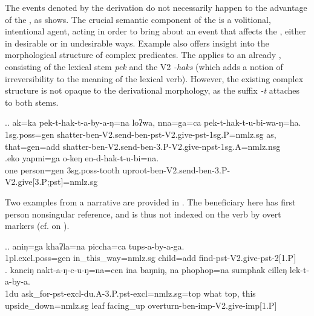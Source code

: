 The events denoted by the  derivation do not necessarily happen to the advantage of the , as \Next shows. The crucial semantic component of the  is a volitional, intentional agent, acting in order to bring about an event that affects the , either in desirable or in undesirable ways. Example \Next also offers insight into the morphological structure of complex predicates. The  applies to an already , consisting of the lexical stem \emph{pek}  and the V2 \emph{-haks}  (which adds a notion of irreversibility to the meaning of the lexical verb). However, the existing complex structure is not opaque to the derivational morphology, as the  suffix \emph{-t} attaches to both stems.

\ex.\ag. ak=ka pek-t-hak-t-a-by-a-ŋ=na loʔwa, nna=ga=ca  pek-t-hak-t-u-bi-wa-ŋ=ha.\\
{\sc 1sg.poss=gen} shatter-{\sc ben-V2.send-ben-pst-V2.give-pst-1sg.P=nmlz.sg} as,   that{\sc =gen=add} shatter-{\sc ben-V2.send-ben-3.P-V2.give-npst-1sg.A=nmlz.nsg}\\
 
\bg.eko yapmi=ga o-keŋ en-d-hak-t-u-bi=na.\\
one person{\sc =gen} {\sc 3sg.poss-}tooth	uproot{\sc -ben-V2.send-ben-3.P-V2.give[3.P;pst]=nmlz.sg}\\
 
\largerpage
Two examples from a narrative are provided in \Next. The beneficiary here has first person nonsingular reference, and is thus not indexed on the verb by overt markers (cf.  on ).

\ex.\ag. aniŋ=ga          khaʔla=na   piccha=ca    tups-a-by-a-ga.\\
	{\sc 1pl.excl.poss=gen} in\_this\_way{\sc =nmlz.sg} child{\sc =add} find{\sc -pst-V2.give-pst-2[1.P]}\\
 
\bg. kanciŋ nakt-a-ŋ-c-u-ŋ=na=cen ina baŋniŋ, na phophop=na sumphak cilleŋ  lek-t-a-by-a.\\
 {\sc 1du} ask\_for{\sc -pst-excl-du.A-3.P.pst-excl=nmlz.sg=top} what  {\sc top}, this upside\_down{\sc =nmlz.sg} leaf    facing\_up overturn{\sc -ben-imp-V2.give-imp[1.P]}\\


